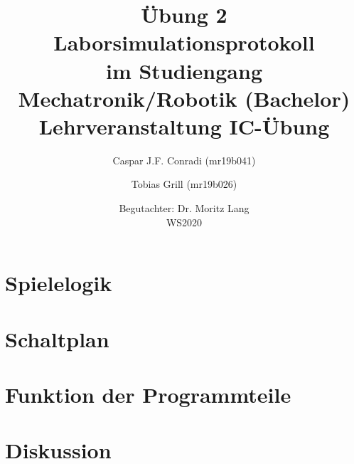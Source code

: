 \documentclass[a4paper]{article}
\title{{\huge Übung 2}\\Laborsimulationsprotokoll\\ \large im Studiengang Mechatronik/Robotik (Bachelor) Lehrveranstaltung IC-Übung}
\date{Begutachter: Dr. Moritz Lang \\ WS2020}
\author{Caspar J.F. Conradi (mr19b041) \and Tobias Grill (mr19b026)}
\begin{document}
    \maketitle
    \newpage

    

    \section{Spielelogik}
    \section{Schaltplan}    %
    \section{Funktion der Programmteile} %
    \section{Diskussion}
    \blindtext
    \blindtext
    
    
\end{document}

